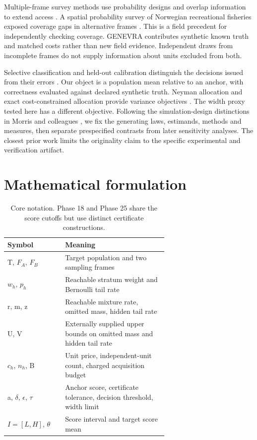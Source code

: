 \documentclass[article,nojss]{jss}
\begin{document}
Multiple-frame survey methods use probability designs and overlap
information to extend access \citep{lohr2006}. A spatial probability
survey of Norwegian recreational fisheries exposed coverage gaps in
alternative frames \citep{volstad2020}. This is a field precedent for
independently checking coverage. GENEVRA contributes synthetic known
truth and matched costs rather than new field evidence. Independent
draws from incomplete frames do not supply information about units
excluded from both.

Selective classification and held-out calibration distinguish the
decisions issued from their errors \citep{geifman2017,angelopoulos2025}.
Our object is a population mean relative to an anchor, with correctness
evaluated against declared synthetic truth. Neyman allocation and exact
cost-constrained allocation provide variance objectives
\citep{neyman1934,wright2019}. The width proxy tested here has a
different objective. Following the simulation-design distinctions in
Morris and colleagues \citep{morris2019}, we fix the generating laws,
estimands, methods and measures, then separate prespecified contrasts
from later sensitivity analyses. The closest prior work limits the
originality claim to the specific experimental and verification
artifact.

\section{Mathematical formulation}

\begin{table}[htbp]
\centering
\small
\begin{tabular}{lp{0.64\linewidth}}
\hline
Symbol & Meaning \\
\hline
T, \(F_A\), \(F_B\) & Target population and two sampling frames \\
\(w_h\), \(p_h\) & Reachable stratum weight and Bernoulli tail rate \\
r, m, z & Reachable mixture rate, omitted mass, hidden tail rate \\
U, V & Externally supplied upper bounds on omitted mass and hidden tail rate \\
\(c_h\), \(n_h\), B & Unit price, independent-unit count, charged acquisition budget \\
a, \ensuremath{\delta}, \ensuremath{\epsilon}, \ensuremath{\tau} & Anchor score, certificate tolerance, decision threshold, width limit \\
\(I=[L,H]\), \ensuremath{\theta} & Score interval and target score mean \\
\hline
\end{tabular}
\caption{Core notation. Phase 18 and Phase 25 share the score cutoffs but use distinct certificate constructions.}
\label{tab:notation}
\end{table}
\end{document}
